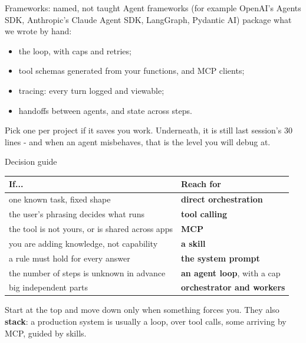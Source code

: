 \documentclass[aspectratio=169]{beamer}
\newcommand{\keybox}[1]{%
  \begin{tcolorbox}[colback=armblue!8, colframe=armblue, boxrule=0.6pt, arc=2pt]
  #1
  \end{tcolorbox}}
\newcommand{\takebox}[1]{%
  \begin{tcolorbox}[colback=paramgreen!8, colframe=paramgreen, boxrule=0.6pt, arc=2pt]
  #1
  \end{tcolorbox}}
\begin{document}
\begin{frame}{Frameworks: named, not taught}
  \vspace{0.4em}
  Agent frameworks (for example OpenAI's Agents SDK, Anthropic's Claude Agent SDK, LangGraph, Pydantic AI)
  package what we wrote by hand:

  \vspace{0.3em}
  \begin{itemize}
    \item the loop, with caps and retries;
    \item tool schemas generated from your functions, and MCP clients;
    \item tracing: every turn logged and viewable;
    \item handoffs between agents, and state across steps.
  \end{itemize}

  \vspace{0.4em}
  \keybox{\small Pick one per project if it saves you work. Underneath, it is still last session's 30 lines - and
  when an agent misbehaves, that is the level you will debug at.}
\end{frame}

\begin{frame}{Decision guide}
  \vspace{0.2em}
  \begin{center}
  \small
  \begin{tabular}{p{}p{}}
    \toprule
    \textbf{If...} & \textbf{Reach for} \\
    \midrule
    one known task, fixed shape & \textbf{direct orchestration} \\[0.1em]
    the user's phrasing decides what runs & \textbf{tool calling} \\[0.1em]
    the tool is not yours, or is shared across apps & \textbf{MCP} \\[0.1em]
    you are adding knowledge, not capability & \textbf{a skill} \\[0.1em]
    a rule must hold for every answer & \textbf{the system prompt} \\[0.1em]
    the number of steps is unknown in advance & \textbf{an agent loop}, with a cap \\[0.1em]
    big independent parts & \textbf{orchestrator and workers} \\
    \bottomrule
  \end{tabular}
  \end{center}

  \vspace{0.2em}
  \takebox{\small Start at the top and move down only when something forces you. They also \textbf{stack}: a
  production system is usually a loop, over tool calls, some arriving by MCP, guided by skills.}
\end{frame}
\end{document}
